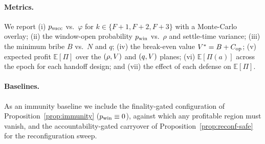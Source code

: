 \paragraph{Metrics.}
We report (i) $p_{\mathrm{succ}}$ vs.\ $\varphi$ for $k\in\{F{+}1,F{+}2,F{+}3\}$ with a Monte-Carlo overlay;
(ii) the window-open probability $p_{\mathrm{win}}$ vs.\ $\rho$ and settle-time variance; (iii) the minimum bribe
$B$ vs.\ $N$ and $q$; (iv) the break-even value $V^{*}=B+C_{\mathrm{op}}$; (v) expected profit
$\mathbb{E}[\Pi]$ over the $(\rho,V)$ and $(q,V)$ planes; (vi) $\mathbb{E}[\Pi(a)]$ across the
epoch for each handoff design; and (vii) the effect of each defense on $\mathbb{E}[\Pi]$.

\paragraph{Baselines.}
As an immunity baseline we include the finality-gated configuration of
Proposition~\ref{prop:immunity} ($p_{\mathrm{win}}\equiv0$), against which any profitable region must vanish, and
the accountability-gated carryover of Proposition~\ref{prop:reconf-safe} for the reconfiguration
sweep.
